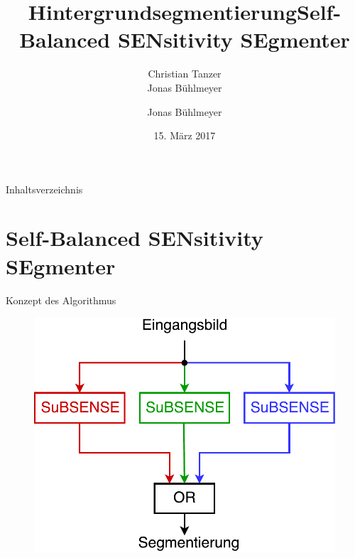 \documentclass[hyperref={pdfpagelabels=false}]{beamer}
\title{Hintergrundsegmentierung}
\author{Christian Tanzer\\Jonas Bühlmeyer}
\date{15. März 2017}
\begin{document}
\begin{frame}
	\maketitle
\end{frame}

\setcounter{framenumber}{0}

\begin{frame}[t]{Inhaltsverzeichnis}
	\tableofcontents[] 
\end{frame}


\title{Self-Balanced SENsitivity SEgmenter}   
\author{Jonas Bühlmeyer} 
\date{}

\section{Self-Balanced SENsitivity SEgmenter}

\begin{frame}
	\maketitle
\end{frame}



\begin{frame}[t]{Konzept des Algorithmus}
	\begin{figure}
		\centering
		\includegraphics[width=0.8\linewidth]{Abbildungen/multiprocess.pdf}
		\label{fig:Abbildungen/Grid}
	\end{figure}
\end{frame}
\end{document}
